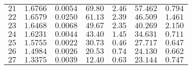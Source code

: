 \documentclass[12pt,a4]{article}
\begin{document}
\begin{table}[h]
\begin{tabular}{c | c | c | c | c | c | c }
$ 21 $&$ 1.6766 $&$ 0.0054 $&$ 69.80 $&$ 2.46 $&$ 57.462 $&$ 0.794 $\\
$ 22 $&$ 1.6579 $&$ 0.0250 $&$ 61.13 $&$ 2.39 $&$ 46.509 $&$ 1.461 $\\
$ 23 $&$ 1.6468 $&$ 0.0068 $&$ 49.67 $&$ 2.35 $&$ 40.269 $&$ 2.150 $\\
$ 24 $&$ 1.6231 $&$ 0.0044 $&$ 43.40 $&$ 1.45 $&$ 34.631 $&$ 0.711 $\\
$ 25 $&$ 1.5755 $&$ 0.0022 $&$ 30.73 $&$ 0.46 $&$ 27.717 $&$ 0.647 $\\
$ 26 $&$ 1.4984 $&$ 0.0026 $&$ 20.53 $&$ 0.74 $&$ 24.130 $&$ 0.662 $\\
$ 27 $&$ 1.3375 $&$ 0.0039 $&$ 12.40 $&$ 0.63 $&$ 23.144 $&$ 0.747 $\\
\end{tabular}
\end{table}
\end{document}
